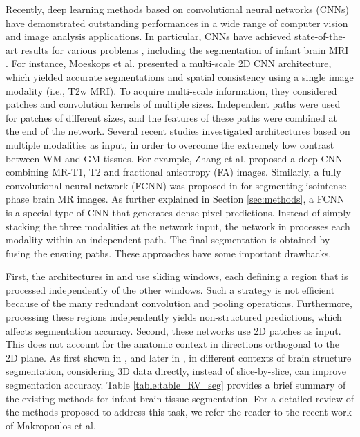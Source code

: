 \documentclass[twoside,espcrc2]{elsarticle}
\begin{document}
Recently, deep learning methods based on convolutional neural networks (CNNs) have demonstrated outstanding performances in a wide range of computer vision and image analysis applications. In particular, CNNs have achieved state-of-the-art results for various problems \cite{long2015fully,kamnitsas2017efficient,DolzNeuro2017,Fechter_Esophagus}, including the segmentation of infant brain MRI \cite{moeskops2016automatic,zhang2015deep,nie2016fully}. For instance, Moeskops et al. \cite{moeskops2016automatic} presented a multi-scale 2D CNN architecture, which yielded accurate segmentations and spatial consistency using a single image modality (i.e., T2w MRI). To acquire multi-scale information, they considered patches and convolution kernels of multiple sizes. Independent paths were used for patches of different sizes, and the features of these paths were combined at the end of the network. Several recent studies investigated architectures based on multiple modalities as input, in order to overcome the extremely low contrast between WM and GM tissues. For example, Zhang et al. \cite{zhang2015deep} proposed a deep CNN combining MR-T1, T2 and fractional anisotropy (FA) images. Similarly, a fully convolutional neural network (FCNN) was proposed in \cite{nie2016fully} for segmenting isointense phase brain MR images. As further explained in Section \ref{sec:methods}, a FCNN is a special type of CNN that generates dense pixel predictions. Instead of simply stacking the three modalities at the network input, the network in \cite{nie2016fully} processes each modality within an independent path. The final segmentation is obtained by fusing the ensuing paths. These approaches have some important drawbacks. 

First, the architectures in \cite{moeskops2016automatic} and \cite{zhang2015deep} use sliding windows, each defining a region that is processed independently of the other windows. Such a strategy is not efficient because of the many redundant convolution and pooling operations. Furthermore, processing these regions independently yields non-structured predictions, which affects segmentation accuracy. Second, these networks use 2D patches as input. This does not account for the anatomic context in directions orthogonal to the 2D plane. As first shown in \cite{kamnitsas2017efficient}, and later in \cite{DolzNeuro2017}, in different contexts of brain structure segmentation, considering 3D data directly, instead of slice-by-slice, can improve segmentation accuracy. Table \ref{table:table_RV_seg} provides a brief summary of the existing methods for infant brain tissue segmentation. For a detailed review of the methods proposed to address this task, we refer the reader to the recent work of Makropoulos et al. \cite{makropoulos2017review}  
\end{document}
